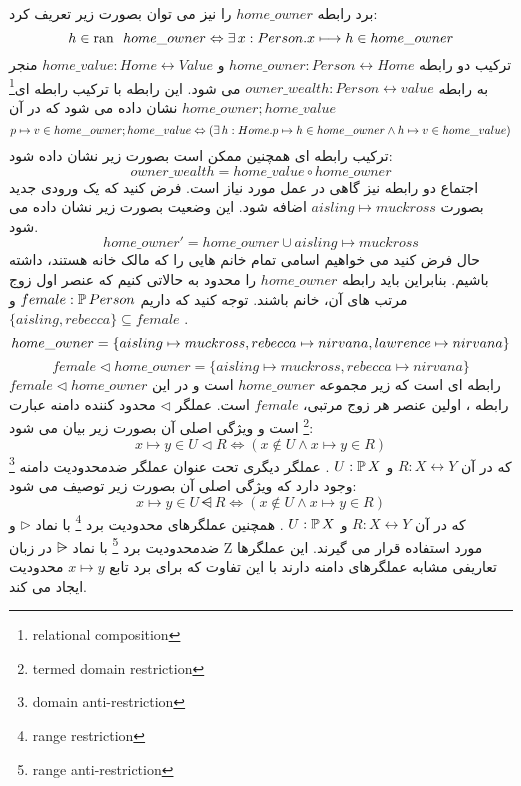 برد رابطه $home\_owner$ را نیز می توان بصورت زیر تعریف کرد:
\[
h \in  \ran \enspace home\_owner \Leftrightarrow \exists x : Person . x \longmapsto h \in home\_owner
\]
ترکیب دو رابطه 
$home\_owner:Person\leftrightarrow Home$
و
$home\_value: Home \leftrightarrow Value$
منجر به رابطه
$owner\_wealth: Person \leftrightarrow value$
می شود. این رابطه با ترکیب رابطه ای\footnote{relational composition} 
$home\_owner ;home\_value$
نشان داده می شود که در آن
\[
p\mapsto v \in home\_owner ; home\_value  \Leftrightarrow 
\\ (\exists h: Home . p\mapsto h \in home\_owner \wedge h\mapsto v \in home\_value)
\]
ترکیب رابطه ای همچنین ممکن است بصورت زیر نشان داده شود:
\[ owner\_wealth=home\_value \circ home\_owner \]
اجتماع دو رابطه نیز گاهی در عمل مورد نیاز است. فرض کنید که یک ورودی جدید بصورت 
$aisling \mapsto muckross$
اضافه شود. این وضعیت بصورت زیر نشان داده می شود.
\[ home\_owner'= home\_owner \cup {aisling \mapsto muckross}\]
حال فرض کنید می خواهیم اسامی تمام خانم هایی را که مالک خانه هستند، داشته باشیم. بنابراین باید رابطه
$home\_owner$
را محدود به حالاتی کنیم که عنصر اول زوج مرتب های آن، خانم باشند. توجه کنید که داریم
$female: \mathop{\mathstrut{\mathbb P}}\nolimits Person$
و
$\{aisling , rebecca\} \subseteq female$
.
\[home\_owner =\{aisling \mapsto muckross, rebecca \mapsto nirvana,
\\ lawrence \mapsto nirvana\}\]
\[female \triangleleft home\_owner =\{ aisling \mapsto muckross , rebecca \mapsto nirvana\}\]
$female \triangleleft home\_owner$
رابطه ای است که زیر مجموعه $home\_owner$ است و در این رابطه ، اولین عنصر هر زوج مرتبی، $female$ است. عملگر  
$\triangleleft$
محدود کننده دامنه عبارت \footnote{termed domain restriction}
است و ویژگی اصلی آن بصورت زیر بیان می شود:
\[ x\mapsto y \in U \triangleleft R \Leftrightarrow (x \notin U \wedge x\mapsto y \in R)\]
که در آن
$R: X \leftrightarrow Y$
و
$U : \mathop{\mathstrut{\mathbb P}}\nolimits X$
.
عملگر دیگری تحت عنوان عملگر ضدمحدودیت دامنه \footnote{domain anti-restriction}
وجود دارد که ویژگی اصلی آن بصورت زیر توصیف می شود:
\[ x\mapsto y \in U \ndres R \Leftrightarrow (x \notin U \wedge x\mapsto y \in R)\]
که در آن
$R: X \leftrightarrow Y$
و
$U : \mathop{\mathstrut{\mathbb P}}\nolimits X$
. 
همچنین عملگرهای محدودیت برد \footnote{range restriction}
با نماد $\triangleright$ و  ضدمحدودیت برد \footnote{range anti-restriction}
با نماد $\rsub$ در زبان Z مورد استفاده قرار می گیرند. این عملگرها تعاریفی مشابه عملگرهای دامنه دارند با این تفاوت که برای برد تابع $x\mapsto y$ محدودیت ایجاد می کند.


